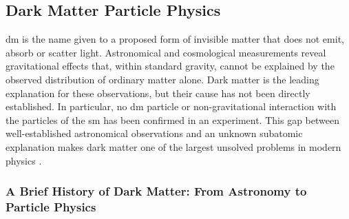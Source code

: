 
























































\subsection{Dark Matter Particle Physics}
\label{sec:dm_particle_physics}

\gls{dm} is the name given to a proposed form of invisible matter that does not
emit, absorb or scatter light. Astronomical and cosmological measurements reveal
gravitational effects that, within standard gravity, cannot be explained by the
observed distribution of ordinary matter alone. Dark matter is the leading
explanation for these observations, but their cause has not been directly
established. In particular, no \gls{dm} particle or non-gravitational interaction
with the particles of the \gls{sm} has been confirmed in an experiment. This gap
between well-established astronomical observations and an unknown subatomic
explanation makes dark matter one of the largest unsolved problems in modern
physics \cite{bertone2016-history-dark-matter,cirelli2026-darkmatter}.

\subsubsection{A Brief History of Dark Matter: From Astronomy to Particle Physics}
\label{sec:history}

